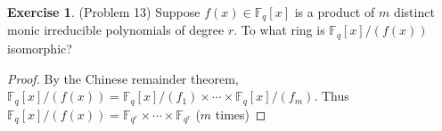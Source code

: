 \documentclass[12pt, psamsfonts]{amsart}
\theoremstyle{definition}
\newtheorem*{exer}{Exercise}
\theoremstyle{remark}
\numberwithin{equation}{section}
\begin{document}
\begin{exer}{(Problem 13)}
  Suppose $f(x) \in \mathbb{F}_q[x]$ is a product of $m$ distinct monic irreducible polynomials of degree $r$.
  To what ring is $\mathbb{F}_q[x]/(f(x))$ isomorphic?
\end{exer}

\begin{proof}
  By the Chinese remainder theorem, $\mathbb{F}_q[x]/(f(x)) = \mathbb{F}_q[x]/(f_1) \times \cdots \times \mathbb{F}_q[x]/(f_m)$.
  Thus $\mathbb{F}_q[x]/(f(x)) = \mathbb{F}_{q^r} \times \cdots \times \mathbb{F}_{q^r}$ ($m$ times)
\end{proof}
\end{document}
